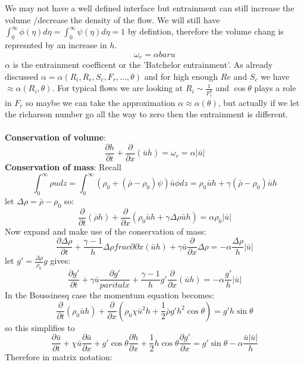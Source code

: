 \documentclass{article}
\begin{document}
We may not have a well defined interface but entrainment can still increase the volume /decrease the density of the flow. We will still have $\int_0^{\infty} \phi(\eta) d \eta = \int_0^{\infty} \psi( \eta ) d\eta = 1$ by defintion, therefore the volume chang is represnted by an increase in $h$.
$$
 \omega_{e} = \alpha bar u
$$
$\alpha$ is the entrainment coefficent or the 'Batchelor entrainment'. As already discussed $\alpha = \alpha (R_i , R_e, S_c, F_r,..., \theta)$ and for high enough $Re$ and $S_c$ we have $\approx \alpha(R_i, \theta)$. For typical flows we are looking at $R_i \sim \frac{1}{F_r^2}$ and $\cos \theta$ plays a role in $F_r$ so maybe we can take the approximation $\alpha \approx \alpha(\theta)$, but actually if we let the richarson number go all the way to zero then the entrainment is different.\\\\
\textbf{Conservation of volume}:
$$
 \frac{\partial h}{\partial t} + \frac{\partial}{\partial x} ( \bar u h) = \omega_e = \alpha | \bar u|
$$
\textbf{Conservation of mass}: Recall
$$
\int_0^{\infty} \rho u dz = \int^{\infty}_0 ( \rho_0 + ( \bar \rho - \rho_0) \psi) \bar u \phi dz = \rho_0 \bar u h + \gamma ( \bar \rho - \rho_0 ) \bar u h 
$$
let $\Delta \rho = \bar \rho - \rho_0$ so:
$$
 \frac{\partial}{\partial t}( \bar \rho h) + \frac{\partial}{\partial x} ( \rho_0 \bar u h + \gamma \Delta \rho \bar u h) = \alpha \rho_0 | \bar u|
$$
Now expand and make use of the conservation of mass:
$$
 \frac{\partial \Delta \rho}{\partial t} + \frac{\gamma -1}{h} \Delta \rho frac{\partial}{\partial x} ( \bar u h) + \gamma \bar u  \frac{\partial}{\partial x} \Delta \rho = - \alpha \frac{\Delta \rho}{h} | \bar u|
$$
let $g' = \frac{\Delta \rho}{\rho_0} g$ gives:
$$
 \frac{\partial g'}{\partial t} + \gamma \bar u \frac{\partial g'}{parital x} + \frac{\gamma -1}{h} g' \frac{\partial}{\partial x} ( \bar u h) = - \alpha \frac{g'}{h} | \bar u |
$$
In the Boussinesq case the momentum equation becomes:
$$
 \frac{\partial}{\partial t} ( \rho_0 \bar u h) + \frac{\partial}{\partial x} ( \rho_0 \chi \bar u^2 h + \frac{ 1}{2} \bar \rho g' h^2 \cos \theta) = g' h \sin \theta
$$
so this simplifies to
$$
\frac{\partial \bar u}{\partial t} + \chi \bar u \frac{\partial \bar u}{\partial x} + g' \cos \theta \frac{\partial h}{\partial x} + \frac{1}{2} h \cos \theta \frac{\partial g'}{\partial x} = g' \sin \theta - \alpha \frac{\bar u | \bar u|}{h}
$$
Therefore in matrix notation:
\end{document}
